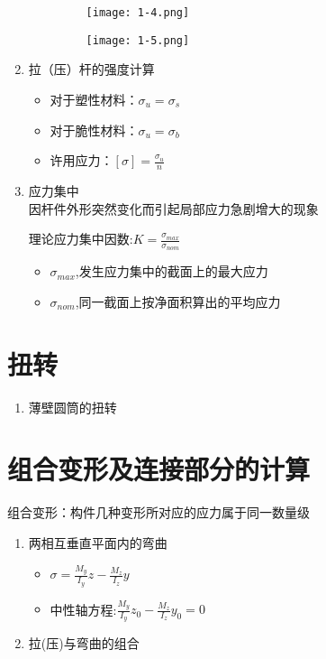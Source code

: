 \documentclass[12pt]{ctexbook}
\theoremstyle{plain}
\begin{document}
\begin{enumerate}[label={\arabic*}]
\begin{enumerate}
\begin{figure}[htbp]
        \texttt{[image: 1-4.png]}
      \end{figure}
      \begin{figure}[htbp]
        \centering
        \texttt{[image: 1-5.png]}
      \end{figure}
\end{enumerate}
\item 拉（压）杆的强度计算
\begin{itemize}
    \item 对于塑性材料：$\sigma_u=\sigma_s$
    \item 对于脆性材料：$\sigma_u=\sigma_b$
    \item 许用应力：$[\sigma]=\frac{\sigma_u}{n}$
\end{itemize}
\item 应力集中\\
因杆件外形突然变化而引起局部应力急剧增大的现象

理论应力集中因数:$K=\frac{\sigma_{max}}{\sigma_{nom}}$
\begin{itemize}
    \item $\sigma_{max}$,发生应力集中的截面上的最大应力
    \item $\sigma_{nom}$,同一截面上按净面积算出的平均应力
\end{itemize}
\end{enumerate}

\newpage

\chapter{扭转}
\begin{enumerate}[label={\arabic*}] 
  \item 薄壁圆筒的扭转
\end{enumerate}

\chapter{组合变形及连接部分的计算}
组合变形：构件几种变形所对应的应力属于同一数量级
\begin{enumerate}[label={\arabic*}] 
    \item 两相互垂直平面内的弯曲
   
    \begin{itemize}
        \item $\sigma=\frac{M_y}{I_y}z-\frac{M_z}{I_z}y$
        \item 中性轴方程:$\frac{M_y}{I_y}z_0-\frac{M_z}{I_z}y_0=0$
    \end{itemize}
  \item 拉(压)与弯曲的组合
  
  \end{enumerate}
\end{document}

